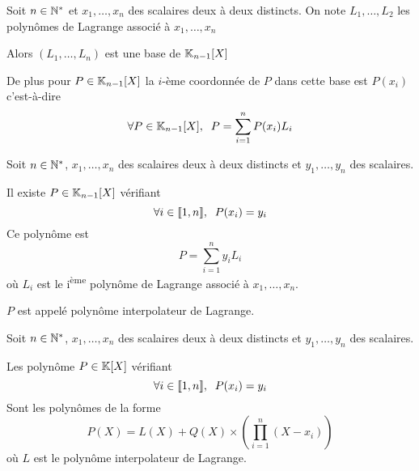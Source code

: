 \begin{prp}
Soit $n \in \mathbb{N}^*$ et $x_1, \ldots, x_n$ des scalaires deux à deux
distincts.
On note $L_1, \ldots, L_2$ les polynômes de Lagrange associé à
$x_1, \ldots, x_n$ 

Alors $(L_1, \ldots, L_n)$ est une base de $\mathbb{K}_{n - 1}[X]$

De plus pour $P \in \mathbb{K}_{n - 1}[X]$ la $i$-ème coordonnée
de $P$ dans cette base est $P(x_i)$ c'est-à-dire
\[
    \forall P \in \mathbb{K}_{n - 1}[X], \;\; P = \sum^n_{i = 1} P(x_i) L_i
\]
\end{prp}

\begin{prp}
Soit $n \in \mathbb{N}^*$, $x_1, \ldots, x_n$ des scalaires deux à deux distincts
et $y_1, \ldots, y_n$ des scalaires.

Il existe $P \in \mathbb{K}_{n - 1}[X]$ vérifiant 
\[
    \forall i \in \llbracket 1, n \rrbracket, \;\; P(x_i) = y_i
\]
Ce polynôme est
\[
    P = \sum^n_{i = 1} y_i L_i
\]
où $L_i$ est le i\textsuperscript{ème} polynôme de Lagrange associé à
$x_1, \ldots, x_n$.

$P$ est appelé polynôme interpolateur de Lagrange.
\end{prp}

\begin{prp}
Soit $n \in \mathbb{N}^*$, $x_1, \ldots, x_n$ des scalaires deux à deux distincts
et $y_1, \ldots, y_n$ des scalaires.

Les polynôme $P \in \mathbb{K}[X]$ vérifiant
\[
    \forall i \in \llbracket 1, n \rrbracket, \;\; P(x_i) = y_i
\]
Sont les polynômes de la forme
\[
    P(X) = L(X) + Q(X) \times \left( \prod^n_{i = 1} (X - x_i)
    \right)
\]
où $L$ est le polynôme interpolateur de Lagrange.
\end{prp}



